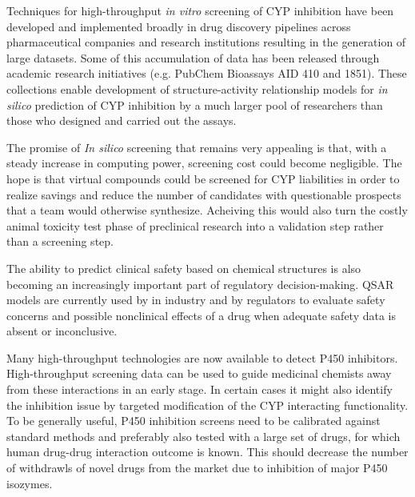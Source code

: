 Techniques for high-throughput \textit{in vitro} screening of CYP inhibition have been developed and implemented broadly in drug discovery pipelines across pharmaceutical companies and research institutions resulting in the generation of large datasets. Some of this accumulation of data has been released through academic research initiatives (e.g. PubChem Bioassays AID 410 and 1851). These collections enable development of structure-activity relationship models for \textit{in silico} prediction of CYP inhibition by a much larger pool of researchers than those who designed and carried out the assays.

The promise of \textit{In silico} screening that remains very appealing is that, with a steady increase in computing power, screening cost could become negligible. The hope is that virtual compounds could be screened for CYP liabilities in order to realize savings and reduce the number of candidates with questionable prospects that a team would otherwise synthesize.\cite{Zlokarnik2005} Acheiving this would also turn the costly animal toxicity test phase of preclinical research into a validation step rather than a screening step.




The ability to predict clinical safety based on chemical structures is also becoming an increasingly important part of regulatory decision-making. QSAR models are currently used by in industry and by regulators to evaluate safety concerns and possible nonclinical effects of a drug when adequate safety data is absent or inconclusive.\cite{Kruhlak2012}


Many high-throughput technologies are now available to detect P450 inhibitors. High-throughput screening data can be used to guide medicinal chemists away from these interactions in an early stage. In certain cases it might also identify the inhibition issue by targeted modification of the CYP interacting functionality. To be generally useful, P450 inhibition screens need to be calibrated against standard methods and preferably also tested with a large set of drugs, for which human drug-drug interaction outcome is known. \cite{Zlokarnik2005} This should decrease the number of withdrawls of novel drugs from the market due to inhibition of major P450 isozymes.


